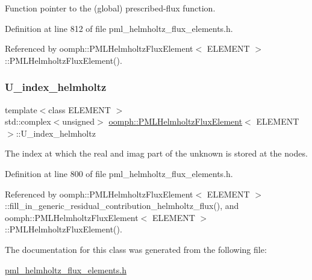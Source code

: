 Function pointer to the (global) prescribed-\/flux function. 



Definition at line 812 of file pml\+\_\+helmholtz\+\_\+flux\+\_\+elements.\+h.



Referenced by oomph\+::\+P\+M\+L\+Helmholtz\+Flux\+Element$<$ E\+L\+E\+M\+E\+N\+T $>$\+::\+P\+M\+L\+Helmholtz\+Flux\+Element().

\mbox{\label{classoomph_1_1PMLHelmholtzFluxElement_a34f53e4408eeba19c609519746179e7e}} 
\subsubsection{\texorpdfstring{U\+\_\+index\+\_\+helmholtz}{U\_index\_helmholtz}}
{\footnotesize\ttfamily template$<$class E\+L\+E\+M\+E\+NT $>$ \\
std\+::complex$<$unsigned$>$ \hyperlink{classoomph_1_1PMLHelmholtzFluxElement}{oomph\+::\+P\+M\+L\+Helmholtz\+Flux\+Element}$<$ E\+L\+E\+M\+E\+NT $>$\+::U\+\_\+index\+\_\+helmholtz\hspace{0.3cm}{\ttfamily [protected]}}



The index at which the real and imag part of the unknown is stored at the nodes. 



Definition at line 800 of file pml\+\_\+helmholtz\+\_\+flux\+\_\+elements.\+h.



Referenced by oomph\+::\+P\+M\+L\+Helmholtz\+Flux\+Element$<$ E\+L\+E\+M\+E\+N\+T $>$\+::fill\+\_\+in\+\_\+generic\+\_\+residual\+\_\+contribution\+\_\+helmholtz\+\_\+flux(), and oomph\+::\+P\+M\+L\+Helmholtz\+Flux\+Element$<$ E\+L\+E\+M\+E\+N\+T $>$\+::\+P\+M\+L\+Helmholtz\+Flux\+Element().



The documentation for this class was generated from the following file\+:\begin{DoxyCompactItemize}
\item 
\hyperlink{pml__helmholtz__flux__elements_8h}{pml\+\_\+helmholtz\+\_\+flux\+\_\+elements.\+h}\end{DoxyCompactItemize}
